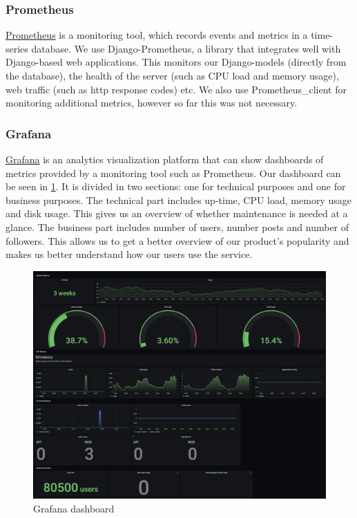 \documentclass[12pt]{article}
\begin{document}
\subsubsection{Prometheus}
\href{https://Prometheus.io/}{Prometheus} is a monitoring tool, which records events and metrics in a time-series database. We use Django-Prometheus, a library that integrates well with Django-based web applications. This monitors our Django-models (directly from the database), the health of the server (such as CPU load and memory usage), web traffic (such as http response codes) etc. We also use Prometheus\_client for monitoring additional metrics, however so far this was not necessary. 

\subsubsection{Grafana}
\href{https://grafana.com/}{Grafana} is an analytics visualization platform that can show dashboards of metrics provided by a monitoring tool such as Prometheus. Our dashboard  can be seen in \ref{fig:dash}. It is divided in two sections: one for technical purposes and one for business purposes. The technical part includes up-time, CPU load, memory usage and disk usage. This gives us an overview of whether maintenance is needed at a glance. The business part includes number of users, number posts and number of followers. This allows us to get a better overview of our product's popularity and makes us better understand how our users use the service.
\begin{figure}[h!]
    \centering
    \includegraphics[width=12cm]{figures/Dash.png}
    \caption{Grafana dashboard}
    \label{fig:dash}
\end{figure}
\end{document}
